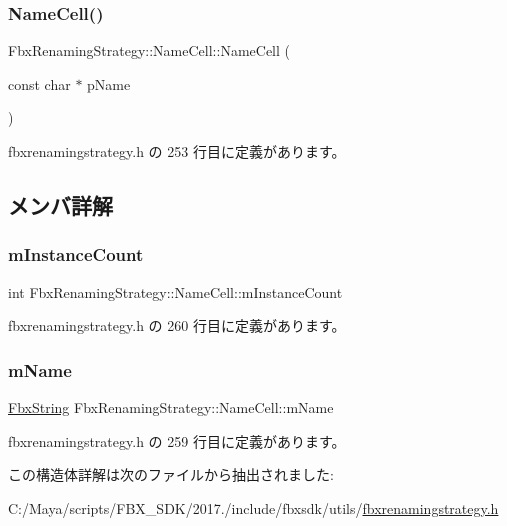 \subsubsection{\texorpdfstring{Name\+Cell()}{NameCell()}}
{\footnotesize\ttfamily Fbx\+Renaming\+Strategy\+::\+Name\+Cell\+::\+Name\+Cell (\begin{DoxyParamCaption}\item[{const char $\ast$}]{p\+Name }\end{DoxyParamCaption})\hspace{0.3cm}{\ttfamily [inline]}}



 fbxrenamingstrategy.\+h の 253 行目に定義があります。



\subsection{メンバ詳解}
\mbox{\label{struct_fbx_renaming_strategy_1_1_name_cell_a2088a0ee75680e2e817f9b782c258e78}} 
\subsubsection{\texorpdfstring{m\+Instance\+Count}{mInstanceCount}}
{\footnotesize\ttfamily int Fbx\+Renaming\+Strategy\+::\+Name\+Cell\+::m\+Instance\+Count}



 fbxrenamingstrategy.\+h の 260 行目に定義があります。

\mbox{\label{struct_fbx_renaming_strategy_1_1_name_cell_a42d722092fdfc81312ef6f0199794580}} 
\subsubsection{\texorpdfstring{m\+Name}{mName}}
{\footnotesize\ttfamily \hyperlink{class_fbx_string}{Fbx\+String} Fbx\+Renaming\+Strategy\+::\+Name\+Cell\+::m\+Name}



 fbxrenamingstrategy.\+h の 259 行目に定義があります。



この構造体詳解は次のファイルから抽出されました\+:\begin{DoxyCompactItemize}
\item 
C\+:/\+Maya/scripts/\+F\+B\+X\+\_\+\+S\+D\+K/2017./include/fbxsdk/utils/\hyperlink{fbxrenamingstrategy_8h}{fbxrenamingstrategy.\+h}\end{DoxyCompactItemize}
